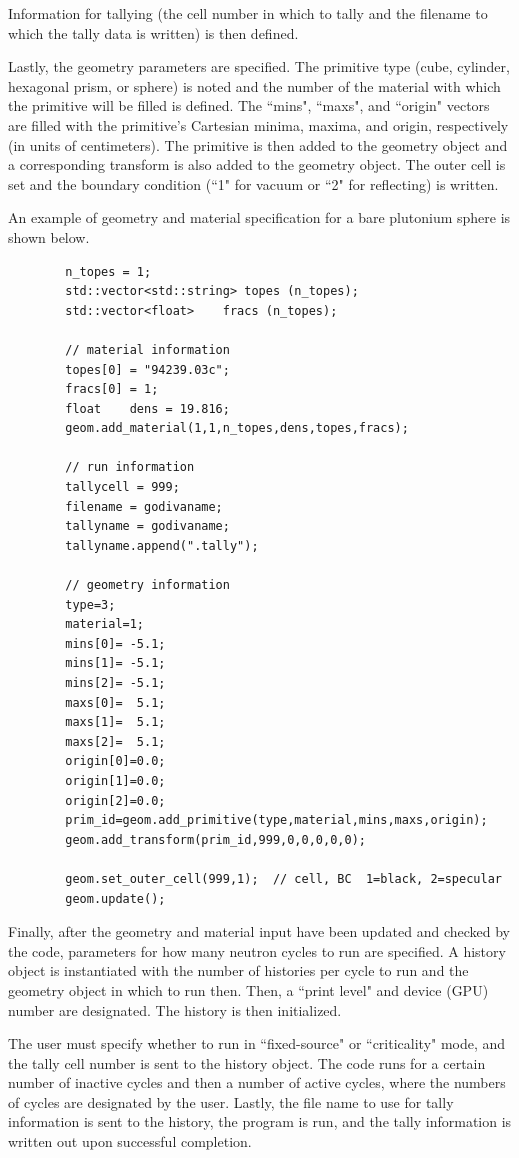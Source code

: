 \documentclass[twoside,a4paper]{refart}
\begin{document}
Information for tallying (the cell number in which to tally and the filename to which the tally data is written) is then defined.

Lastly, the geometry parameters are specified. The primitive type (cube, cylinder, hexagonal prism, or sphere) is noted and the number of the material with which the primitive will be filled is defined. The 
``mins", ``maxs", and ``origin" vectors are filled with the primitive's Cartesian minima, maxima, and origin, respectively (in units of centimeters). The primitive is then added to the geometry object and a corresponding transform is also added to the geometry object. The outer cell is set and the boundary
condition (``1" for vacuum or ``2" for reflecting) is written.

An example of geometry and material specification for a bare plutonium sphere is shown below.

\begin{verbatim}
		n_topes = 1;
		std::vector<std::string> topes (n_topes);
		std::vector<float>    fracs (n_topes);

		// material information
		topes[0] = "94239.03c";
		fracs[0] = 1;      
		float    dens = 19.816;
		geom.add_material(1,1,n_topes,dens,topes,fracs);
		
		// run information
		tallycell = 999;
		filename = godivaname;
		tallyname = godivaname;
		tallyname.append(".tally");
	
		// geometry information
		type=3;
		material=1;
		mins[0]= -5.1;
		mins[1]= -5.1;
		mins[2]= -5.1;
		maxs[0]=  5.1;
		maxs[1]=  5.1;
		maxs[2]=  5.1;
		origin[0]=0.0;
		origin[1]=0.0;
		origin[2]=0.0;
		prim_id=geom.add_primitive(type,material,mins,maxs,origin);
		geom.add_transform(prim_id,999,0,0,0,0,0);

		geom.set_outer_cell(999,1);  // cell, BC  1=black, 2=specular
		geom.update();
\end{verbatim}

Finally, after the geometry and material input have been updated and checked by the code, parameters for 
how many neutron cycles to run are specified. A history object is instantiated with the number of
histories per cycle to run and the geometry object in which to run then. Then, a ``print level" and 
device (GPU) number are designated. The history is then initialized.

The user must specify whether to run in ``fixed-source" or ``criticality" mode, and the tally cell number
is sent to the history object. The code runs for a certain number of inactive cycles and then a number of
active cycles, where the numbers of cycles are designated by the user. Lastly, the file name to use for
tally information is sent to the history, the program is run, and the tally information is written out
upon successful completion.
\end{document}
